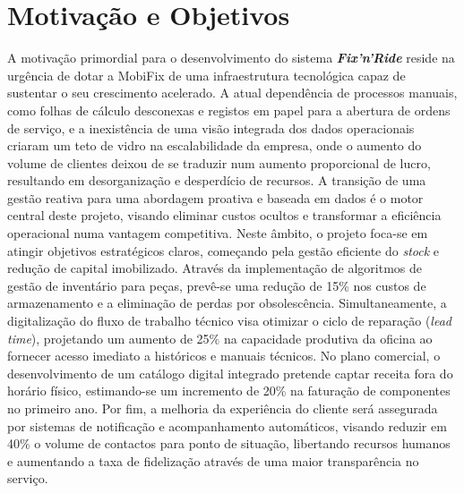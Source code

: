 \documentclass[a4paper,12pt]{scrreprt}
\begin{document}
\section{Motivação e Objetivos}
A motivação primordial para o desenvolvimento do sistema \textit{\textbf{Fix'n'Ride}} reside na urgência de dotar a MobiFix de uma infraestrutura tecnológica capaz de sustentar o seu crescimento acelerado. A atual dependência de processos manuais, como folhas de cálculo desconexas e registos em papel para a abertura de ordens de serviço, e a inexistência de uma visão integrada dos dados operacionais criaram um teto de vidro na escalabilidade da empresa, onde o aumento do volume de clientes deixou de se traduzir num aumento proporcional de lucro, resultando em desorganização e desperdício de recursos. A transição de uma gestão reativa para uma abordagem proativa e baseada em dados é o motor central deste projeto, visando eliminar custos ocultos e transformar a eficiência operacional numa vantagem competitiva. Neste âmbito, o projeto foca-se em atingir objetivos estratégicos claros, começando pela gestão eficiente do \textit{stock} e redução de capital imobilizado. Através da implementação de algoritmos de gestão de inventário para peças, prevê-se uma redução de 15\% nos custos de armazenamento e a eliminação de perdas por obsolescência. Simultaneamente, a digitalização do fluxo de trabalho técnico visa otimizar o ciclo de reparação (\textit{lead time}), projetando um aumento de 25\% na capacidade produtiva da oficina ao fornecer acesso imediato a históricos e manuais técnicos. No plano comercial, o desenvolvimento de um catálogo digital integrado pretende captar receita fora do horário físico, estimando-se um incremento de 20\% na faturação de componentes no primeiro ano. Por fim, a melhoria da experiência do cliente será assegurada por sistemas de notificação e acompanhamento automáticos, visando reduzir em 40\% o volume de contactos para ponto de situação, libertando recursos humanos e aumentando a taxa de fidelização através de uma maior transparência no serviço. 
\end{document}
